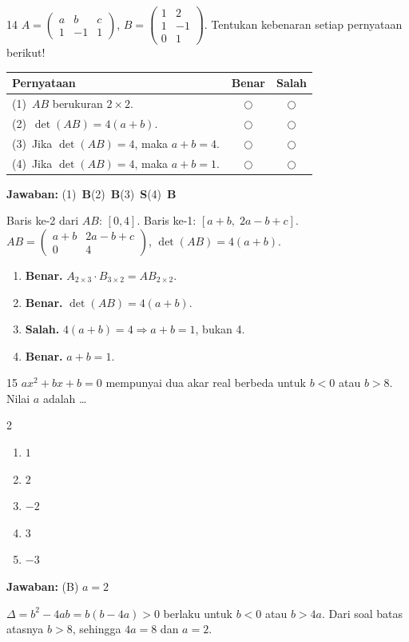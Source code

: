 \documentclass[11pt]{article}
\newcommand{\jawaban}[1]{%
  \noindent\colorbox{gold!30}{\parbox{\dimexpr\linewidth-2\fboxsep\relax}{%
    \textbf{Jawaban:} #1}}\par\smallskip}
\newenvironment{pilB}{%
  \par\smallskip\begin{multicols}{2}
  \begin{enumerate}[label=(\Alph*),leftmargin=*,itemsep=1pt,topsep=3pt]}%
  {\end{enumerate}\end{multicols}}
\begin{document}
\begin{soal}{14}
$A=\begin{pmatrix}a&b&c\\1&-1&1\end{pmatrix}$, $B=\begin{pmatrix}1&2\\1&-1\\0&1\end{pmatrix}$.
Tentukan kebenaran setiap pernyataan berikut!

\par\smallskip
{\renewcommand{\arraystretch}{1.4}%
\begin{tabular}{@{}p{0.76\linewidth}cc@{}}
\hline\textbf{Pernyataan}&\textbf{Benar}&\textbf{Salah}\\\hline
(1)~$AB$ berukuran $2\times2$.&$\bigcirc$&$\bigcirc$\\
(2)~$\det(AB)=4(a+b)$.&$\bigcirc$&$\bigcirc$\\
(3)~Jika $\det(AB)=4$, maka $a+b=4$.&$\bigcirc$&$\bigcirc$\\
(4)~Jika $\det(AB)=4$, maka $a+b=1$.&$\bigcirc$&$\bigcirc$\\\hline
\end{tabular}}
\end{soal}
\begin{pembox}
\jawaban{(1)~\textbf{B}\quad(2)~\textbf{B}\quad(3)~\textbf{S}\quad(4)~\textbf{B}}
Baris ke-2 dari $AB$: $[0,4]$. Baris ke-1: $[a+b,\;2a-b+c]$.
$AB=\begin{pmatrix}a+b&2a-b+c\\0&4\end{pmatrix}$, $\det(AB)=4(a+b)$.
\begin{enumerate}[leftmargin=*,topsep=2pt,itemsep=2pt]
\item \textbf{Benar.} $A_{2\times3}\cdot B_{3\times2}=AB_{2\times2}$.
\item \textbf{Benar.} $\det(AB)=4(a+b)$.
\item \textbf{Salah.} $4(a+b)=4\Rightarrow a+b=1$, bukan 4.
\item \textbf{Benar.} $a+b=1$.
\end{enumerate}
\end{pembox}

\begin{soal}{15}
$ax^2+bx+b=0$ mempunyai dua akar real berbeda untuk $b<0$ atau $b>8$. Nilai $a$ adalah \ldots
\begin{pilB}\item $1$\item $2$\item $-2$\item $3$\item $-3$\end{pilB}
\end{soal}
\begin{pembox}
\jawaban{(B) $a=2$}
$\Delta=b^2-4ab=b(b-4a)>0$ berlaku untuk $b<0$ atau $b>4a$.
Dari soal batas atasnya $b>8$, sehingga $4a=8$ dan $a=2$.
\end{pembox}
\end{document}
